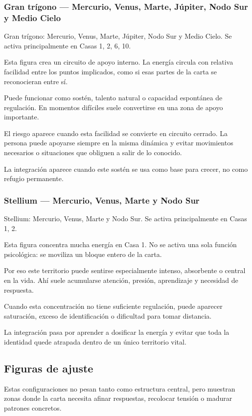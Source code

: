 \documentclass[11pt,a4paper]{article}
\begin{document}
\subsubsection*{Gran trígono — Mercurio, Venus, Marte, Júpiter, Nodo Sur y Medio Cielo}
Gran trígono: Mercurio, Venus, Marte, Júpiter, Nodo Sur y Medio Cielo. Se activa principalmente en Casas 1, 2, 6, 10.

Esta figura crea un circuito de apoyo interno. La energía circula con relativa facilidad entre los puntos implicados, como si esas partes de la carta se reconocieran entre sí.

Puede funcionar como sostén, talento natural o capacidad espontánea de regulación. En momentos difíciles suele convertirse en una zona de apoyo importante.

El riesgo aparece cuando esta facilidad se convierte en circuito cerrado. La persona puede apoyarse siempre en la misma dinámica y evitar movimientos necesarios o situaciones que obliguen a salir de lo conocido.

La integración aparece cuando este sostén se usa como base para crecer, no como refugio permanente.

\subsubsection*{Stellium — Mercurio, Venus, Marte y Nodo Sur}
Stellium: Mercurio, Venus, Marte y Nodo Sur. Se activa principalmente en Casas 1, 2.

Esta figura concentra mucha energía en Casa 1. No se activa una sola función psicológica: se moviliza un bloque entero de la carta.

Por eso este territorio puede sentirse especialmente intenso, absorbente o central en la vida. Ahí suele acumularse atención, presión, aprendizaje y necesidad de respuesta.

Cuando esta concentración no tiene suficiente regulación, puede aparecer saturación, exceso de identificación o dificultad para tomar distancia.

La integración pasa por aprender a dosificar la energía y evitar que toda la identidad quede atrapada dentro de un único territorio vital.

\subsection*{Figuras de ajuste}
Estas configuraciones no pesan tanto como estructura central, pero muestran zonas donde la carta necesita afinar respuestas, recolocar tensión o madurar patrones concretos.
\end{document}
